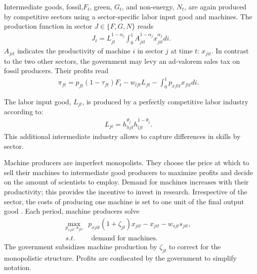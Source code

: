 Intermediate goods, fossil,$F_t$, green, $G_t$, and non-energy, $N_t$, are again produced by competitive sectors using a sector-specific labor input good and machines. The production function in sector $J\in \{F,G,N\}$ reads
\begin{align}
&J_{t}= L_{jt}^{1-\alpha_j}\int_{0}^{1}A_{jit}^{1-\alpha_j}x_{jit}^{\alpha_j} di.
\end{align}
$A_{jit}$ indicates the productivity of machine $i$ in sector $j$ at time $t$: $x_{jit}$. In contrast to the two other sectors, the government may levy an ad-valorem sales tax on fossil producers. Their profits read
\begin{align}
\pi_{ft}=p_{ft}(1-\tau_{ft})F_t-w_{lft}L_{ft}-\int_{0}^{1}p_{xfit}x_{fit}di.
\end{align}

The labor input good, $L_{jt}$, is produced by a perfectly competitive labor industry according to: 
\begin{align}
L_{jt}=h_{hjt}^{\theta_j}h_{ljt}^{1-\theta_j}.
\end{align}
This additional intermediate industry allows to capture differences in skills by sector.

Machine producers are imperfect monopolists. They choose the price at which to sell their machines to intermediate good producers to maximize profits and decide on the amount of scientists to employ. Demand for machines increases with their productivity; this provides the incentive to invest in research. Irrespective of the sector, the costs of producing one machine is set to one unit of the final output good \citep[similar to][]{Fried2018ClimateAnalysis, Acemoglu2012TheChange}.
Each period, machine producers solve
\begin{align}
\underset{p_{xjit}, s_{jit}}{\max}&p_{xjit}(1+\zeta_{jt})x_{jit}-x_{jit}-w_{sjt}s_{jit},\\
s.t.&\ \ \text{demand for machines}.
\end{align}
The government subsidizes machine production by $\zeta_{jt}$ to correct for the monopolistic structure. Profits are confiscated by the government to simplify notation.

